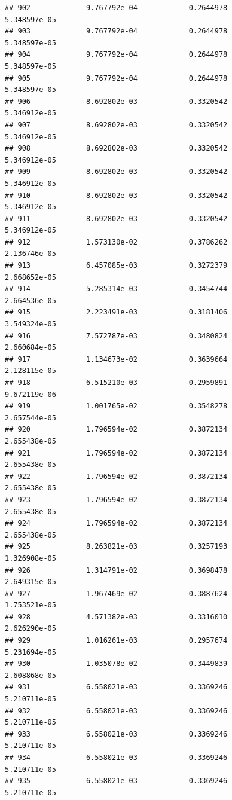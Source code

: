 \documentclass[
]{article}
\begin{document}
\begin{verbatim}
## 902             9.767792e-04            0.2644978            5.348597e-05
## 903             9.767792e-04            0.2644978            5.348597e-05
## 904             9.767792e-04            0.2644978            5.348597e-05
## 905             9.767792e-04            0.2644978            5.348597e-05
## 906             8.692802e-03            0.3320542            5.346912e-05
## 907             8.692802e-03            0.3320542            5.346912e-05
## 908             8.692802e-03            0.3320542            5.346912e-05
## 909             8.692802e-03            0.3320542            5.346912e-05
## 910             8.692802e-03            0.3320542            5.346912e-05
## 911             8.692802e-03            0.3320542            5.346912e-05
## 912             1.573130e-02            0.3786262            2.136746e-05
## 913             6.457085e-03            0.3272379            2.668652e-05
## 914             5.285314e-03            0.3454744            2.664536e-05
## 915             2.223491e-03            0.3181406            3.549324e-05
## 916             7.572787e-03            0.3480824            2.660684e-05
## 917             1.134673e-02            0.3639664            2.128115e-05
## 918             6.515210e-03            0.2959891            9.672119e-06
## 919             1.001765e-02            0.3548278            2.657544e-05
## 920             1.796594e-02            0.3872134            2.655438e-05
## 921             1.796594e-02            0.3872134            2.655438e-05
## 922             1.796594e-02            0.3872134            2.655438e-05
## 923             1.796594e-02            0.3872134            2.655438e-05
## 924             1.796594e-02            0.3872134            2.655438e-05
## 925             8.263821e-03            0.3257193            1.326908e-05
## 926             1.314791e-02            0.3698478            2.649315e-05
## 927             1.967469e-02            0.3887624            1.753521e-05
## 928             4.571382e-03            0.3316010            2.626290e-05
## 929             1.016261e-03            0.2957674            5.231694e-05
## 930             1.035078e-02            0.3449839            2.608868e-05
## 931             6.558021e-03            0.3369246            5.210711e-05
## 932             6.558021e-03            0.3369246            5.210711e-05
## 933             6.558021e-03            0.3369246            5.210711e-05
## 934             6.558021e-03            0.3369246            5.210711e-05
## 935             6.558021e-03            0.3369246            5.210711e-05

\end{verbatim}
\end{document}
